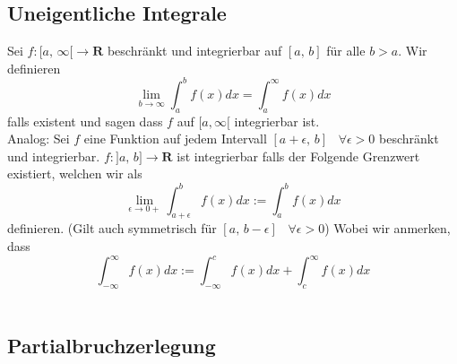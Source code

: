 \documentclass[8pt]{article}
\begin{document}
\begin{multicols*}{3}
\subsection{Uneigentliche Integrale}

Sei $f:[a,\,\infty[ \rightarrow \mathbf{R}$ beschränkt und integrierbar auf $[a,\,b]$ für alle $b > a$. Wir definieren
$$
  \lim_{b \rightarrow \infty} \int_a^b f(x) dx = \int_a^\infty f(x) dx
$$
falls existent und sagen dass $f$ auf $[a, \infty[$ integrierbar ist.\\
Analog: Sei $f$ eine Funktion auf jedem Intervall $[a+\epsilon,\,b]\;\;\;\forall \epsilon > 0$
beschränkt und integrierbar. $f:]a,\,b] \rightarrow \mathbf{R}$ ist integrierbar falls der Folgende Grenzwert existiert, welchen wir als
$$
  \lim_{\epsilon \rightarrow 0+} \int_{a + \epsilon}^b f(x) dx := \int_a^b f(x) dx
$$
definieren. (Gilt auch symmetrisch für $[a,\,b-\epsilon]\;\;\;\forall \epsilon > 0$)
Wobei wir anmerken, dass $$\int_{-\infty}^\infty f(x) dx := \int_{-\infty}^c f(x) dx + \int_c^\infty f(x) dx$$
\\

\subsection{Partialbruchzerlegung}


\end{multicols*}
\end{document}
